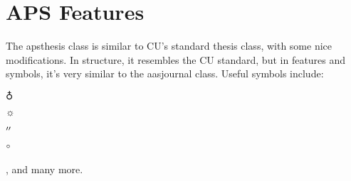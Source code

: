 \chapter{APS Features}
\label{apschap}
The apsthesis class is similar to CU's standard thesis class, with some nice
 modifications. In structure, it resembles the CU standard, but in features
 and symbols, it's very similar to the aasjournal class. Useful symbols include:

 $\earth$

 $\sun$

 $\mbox{$^{\prime\prime}$}$

 $\mbox{$^\circ$}$

 \apj, and many more.
